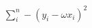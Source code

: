 \documentclass[preview]{standalone}
\begin{document}
\begin{align*}
\sum_i^n - (y_i -\omega x_i)^2
\end{align*}
\end{document}
